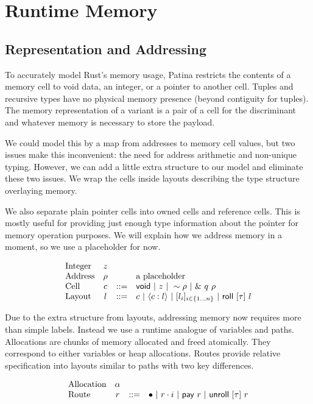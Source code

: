 \section*{Runtime Memory}

\subsection*{Representation and Addressing}

To accurately model Rust's memory usage, Patina restricts
the contents of a memory cell to void data, an integer, or a pointer to another cell.
Tuples and recursive types have no physical memory presence (beyond contiguity for tuples).
The memory representation of a variant is a pair of a cell for the discriminant
and whatever memory is necessary to store the payload.

We could model this by a map from addresses to memory cell values,
but two issues make this inconvenient: the need for address arithmetic
and non-unique typing. However, we can add a little extra structure to
our model and eliminate these two issues. We wrap the cells inside
layouts describing the type structure overlaying memory.

We also separate plain pointer cells into owned cells and reference cells.
This is mostly useful for providing just enough type information about the pointer
for memory operation purposes. We will explain how we address memory in a moment,
so we use a placeholder for now.

\[
\begin{array}{lccl}
\textrm{Integer} & z & & \\
\textrm{Address} & \rho & & \textrm{a placeholder} \\
\textrm{Cell} & c & ::= & \mathsf{void} ~|~ z ~|~ \sim{\rho} ~|~ \&~{q~\rho} \\
\textrm{Layout} & l & ::= & c ~|~ \langle{{c}:{l}}\rangle ~|~ 
			       [{{l}_{i}}]_{{i} \in \{1 \ldots {n}\} } ~|~ \mathsf{roll}~[{\tau}]~{l} \\
\end{array}
\]

Due to the extra structure from layouts, addressing memory now requires
more than simple labels. Instead we use a runtime analogue of variables and paths.
Allocations are chunks of memory allocated and freed atomically.
They correspond to either variables or heap allocations.
Routes provide relative specification into layouts similar to paths with two key differences.

\[
\begin{array}{lccl}
\textrm{Allocation} & \alpha & & \\
\textrm{Route} & r & ::= & \bullet ~|~ {r}\cdot{i} ~|~ \mathsf{pay}~{r} ~|~ \mathsf{unroll}~[{\tau}]~{r} \\
\end{array}
\]

